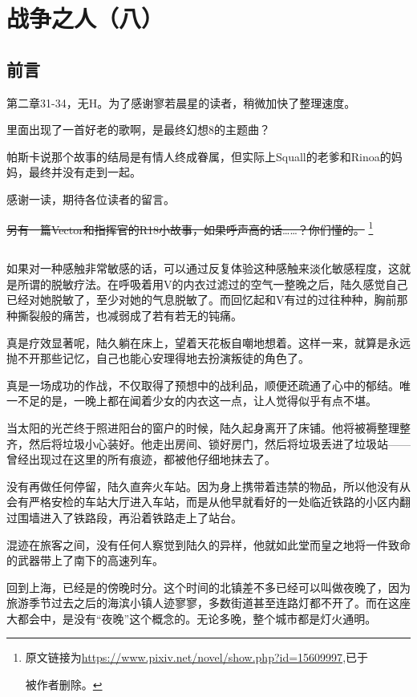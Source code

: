 \chapter{战争之人（八）}
\section*{前言}
第二章31-34，无H。为了感谢寥若晨星的读者，稍微加快了整理速度。

里面出现了一首好老的歌啊，是最终幻想8的主题曲？

帕斯卡说那个故事的结局是有情人终成眷属，但实际上Squall的老爹和Rinoa的妈妈，最终并没有走到一起。

感谢一读，期待各位读者的留言。

\sout{另有一篇Vector和指挥官的R18小故事，如果呼声高的话……？你们懂的。}
\footnote{原文链接为\url{https://www.pixiv.net/novel/show.php?id=15609997},已于\date{2022-05-31}被作者删除。}

\lineseparator
\section*{}

如果对一种感触非常敏感的话，可以通过反复体验这种感触来淡化敏感程度，这就是所谓的脱敏疗法。在呼吸着用V的内衣过滤过的空气一整晚之后，陆久感觉自己已经对她脱敏了，至少对她的气息脱敏了。而回忆起和V有过的过往种种，胸前那种撕裂般的痛苦，也减弱成了若有若无的钝痛。

真是疗效显著呢，陆久躺在床上，望着天花板自嘲地想着。这样一来，就算是永远抛不开那些记忆，自己也能心安理得地去扮演叛徒的角色了。

真是一场成功的作战，不仅取得了预想中的战利品，顺便还疏通了心中的郁结。唯一不足的是，一晚上都在闻着少女的内衣这一点，让人觉得似乎有点不堪。

当太阳的光芒终于照进阳台的窗户的时候，陆久起身离开了床铺。他将被褥整理整齐，然后将垃圾小心装好。他走出房间、锁好房门，然后将垃圾丢进了垃圾站——曾经出现过在这里的所有痕迹，都被他仔细地抹去了。

没有再做任何停留，陆久直奔火车站。因为身上携带着违禁的物品，所以他没有从会有严格安检的车站大厅进入车站，而是从他早就看好的一处临近铁路的小区内翻过围墙进入了铁路段，再沿着铁路走上了站台。

混迹在旅客之间，没有任何人察觉到陆久的异样，他就如此堂而皇之地将一件致命的武器带上了南下的高速列车。

回到上海，已经是的傍晚时分。这个时间的北镇差不多已经可以叫做夜晚了，因为旅游季节过去之后的海滨小镇人迹寥寥，多数街道甚至连路灯都不开了。而在这座大都会中，是没有“夜晚”这个概念的。无论多晚，整个城市都是灯火通明。

